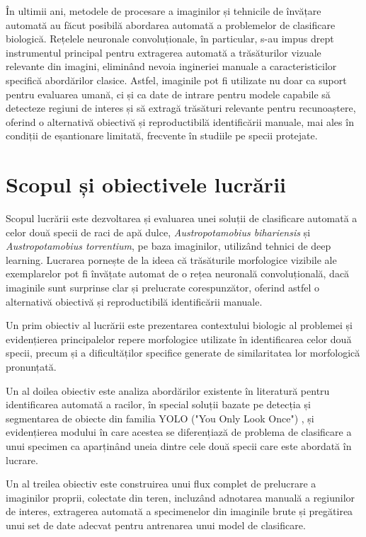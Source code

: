 În ultimii ani, metodele de procesare a imaginilor și tehnicile de învățare automată au făcut posibilă abordarea automată a problemelor de clasificare biologică. 
Rețelele neuronale convoluționale, în particular, s-au impus drept instrumentul principal pentru extragerea automată a trăsăturilor vizuale relevante din imagini, eliminând nevoia ingineriei  manuale a caracteristicilor specifică abordărilor clasice. Astfel, imaginile pot fi utilizate nu doar ca suport pentru evaluarea umană, ci și ca date de intrare pentru modele capabile să detecteze regiuni de interes și să extragă trăsături relevante pentru recunoaștere, oferind o alternativă obiectivă și reproductibilă identificării manuale, mai ales în condiții de eșantionare limitată, frecvente în studiile pe specii protejate.

\section{Scopul și obiectivele lucrării}

Scopul lucrării este dezvoltarea și evaluarea unei soluții de clasificare automată a celor două specii de raci de apă dulce, \textit{Austropotamobius bihariensis} și \textit{Austropotamobius torrentium}, pe baza imaginilor, utilizând tehnici de deep learning. Lucrarea pornește de la ideea că trăsăturile morfologice vizibile ale exemplarelor pot fi învățate automat de o rețea neuronală convoluțională, dacă imaginile sunt surprinse clar și prelucrate corespunzător, oferind astfel o alternativă obiectivă și reproductibilă identificării manuale.

Un prim obiectiv al lucrării este prezentarea contextului biologic al problemei și evidențierea principalelor repere morfologice utilizate în identificarea celor două specii, precum și a dificultăților specifice generate de similaritatea lor morfologică pronunțată.

Un al doilea obiectiv este analiza abordărilor existente în literatură pentru identificarea automată a racilor, în special soluții bazate pe detecția și segmentarea de obiecte din familia YOLO ("You Only Look Once") \cite{YOLO2025}, și evidențierea modului în care acestea se diferențiază de problema de clasificare a unui specimen ca aparținând
uneia dintre cele două specii care este abordată în lucrare.


Un al treilea obiectiv este construirea unui flux complet de prelucrare a imaginilor proprii, colectate din teren, incluzând adnotarea manuală a regiunilor de interes, extragerea automată a specimenelor din imaginile brute și pregătirea unui set de date adecvat pentru antrenarea unui model de clasificare.

